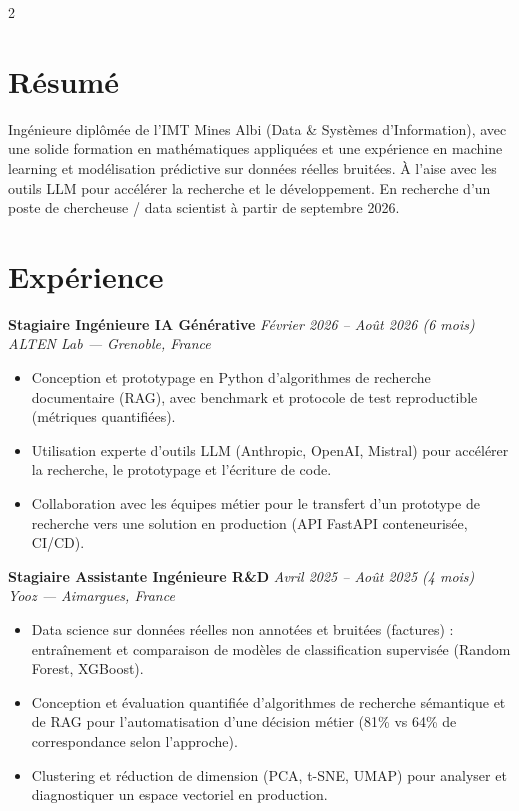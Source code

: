 \documentclass[10.5pt,a4paper]{article}
\newcommand{\sectionrule}{\vspace{-6pt}{\color{accent}\hrule height 1pt}\vspace{2pt}}
\newcommand{\cvexp}[5]{%
  \noindent\textbf{#1} \hfill {\itshape\color{graytext}\small #4}\\
  {\itshape #2 --- #3}\\[-2pt]
  #5
  \vspace{3pt}
}
\begin{document}
\setlength{\columnsep}{1.5em}
\begin{paracol}{2}

\section*{Résumé}
\sectionrule
\justifying
Ingénieure diplômée de l'IMT Mines Albi (Data \& Systèmes d'Information), avec une solide formation en mathématiques appliquées et une expérience en machine learning et modélisation prédictive sur données réelles bruitées. À l'aise avec les outils LLM pour accélérer la recherche et le développement. En recherche d'un poste de chercheuse / data scientist à partir de septembre 2026.

\section*{Expérience}
\sectionrule

\cvexp{Stagiaire Ingénieure IA Générative}{ALTEN Lab}{Grenoble, France}{Février 2026 -- Août 2026 (6 mois)}{%
  \begin{itemize}[leftmargin=12pt, itemsep=2pt, topsep=0pt, partopsep=0pt, parsep=0pt]
    \item Conception et prototypage en Python d'algorithmes de recherche documentaire (RAG), avec benchmark et protocole de test reproductible (métriques quantifiées).
    \item Utilisation experte d'outils LLM (Anthropic, OpenAI, Mistral) pour accélérer la recherche, le prototypage et l'écriture de code.
    \item Collaboration avec les équipes métier pour le transfert d'un prototype de recherche vers une solution en production (API FastAPI conteneurisée, CI/CD).
  \end{itemize}
}

\cvexp{Stagiaire Assistante Ingénieure R\&D}{Yooz}{Aimargues, France}{Avril 2025 -- Août 2025 (4 mois)}{%
  \begin{itemize}[leftmargin=12pt, itemsep=2pt, topsep=0pt, partopsep=0pt, parsep=0pt]
    \item Data science sur données réelles non annotées et bruitées (factures) : entraînement et comparaison de modèles de classification supervisée (Random Forest, XGBoost).
    \item Conception et évaluation quantifiée d'algorithmes de recherche sémantique et de RAG pour l'automatisation d'une décision métier (81\% vs 64\% de correspondance selon l'approche).
    \item Clustering et réduction de dimension (PCA, t-SNE, UMAP) pour analyser et diagnostiquer un espace vectoriel en production.
  \end{itemize}
}


\end{paracol}
\end{document}
